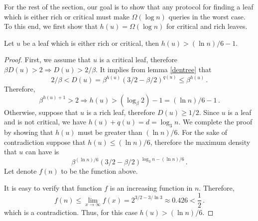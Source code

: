 For the rest of the section, our goal is to show that any protocol for finding a leaf which is either rich or critical must make $\Omega( \log n)$ queries in the worst case. To this end, we first show that $h(u) = \Omega(\log n)$ for critical and rich leaves.
\begin{lemma}
\label{tooheavies}
Let $u$ be a leaf which is either rich or critical, then $h(u) > (\ln n)/6-1$.
\end{lemma} 
\begin{proof}
First, we assume that $u$ is a critical leaf, therefore $\beta D(u) >2 \Rightarrow D(u) > 2/\beta$. It implies from lemma \ref{dentree} that
$$2/\beta < D(u) = \beta ^ {h(u)} (3/2-\beta/2) ^ {q(u)} \le \beta ^ {h(u)} \,.$$
Therefore,
$$ \beta^{h(u)+1} > 2 \Rightarrow h(u) > (\log_{\beta} 2) -1 = (\ln n)/6-1 \,.
$$
Otherwise, suppose that $u$ is a rich leaf, therefore $D(u) \ge 1/2$. Since $u$ is a leaf and is not critical, we have $h(u)+q(u)=d=\log_3 n$. We complete the proof by showing that $h(u)$ must be greater than $(\ln n)/6$. For the sake of contradiction suppose that $h(u) \le (\ln n)/6$, therefore the maximum density that $u$ can have is
$$
\beta ^ { (\ln n)/6} (3/2-\beta/2)^{\log_3 n - (\ln n)/6} \,.
$$
Let denote $f(n)$ to be the function above.

It is easy to verify that function $f$ is an increasing function in $n$. Therefore,
$$
f(n) \le \lim_{x \to \infty} f(x) = 2^{3/2 - 3/\ln 3} \approx 0.426 < \dfrac{1}{2} \,.$$
which is a contradiction. Thus, for this case $h(u) > (\ln n)/6$.
\end{proof}

